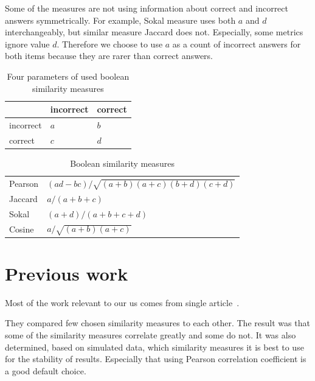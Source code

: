 \documentclass[
  print, %
  table,   %
  nolof,     %
  nolot,     %
  nocover,
  color,
  final,
]{fithesis3}
\begin{document}
Some of the measures are not using information about correct and incorrect answers symmetrically. For example, Sokal measure uses both $a$ and $d$ interchangeably, but similar measure Jaccard does not. Especially, some metrics ignore value $d$. Therefore we choose to use $a$ as a count of incorrect answers for both items because they are rarer than correct answers.


\begin{table}
  \begin{tabular}{ | l | l l | }
      \hline
      \cellcolor[gray]{1.0} & incorrect & correct \\ \hline
      incorrect & $a$ & $b$ \\
      correct & $c$ & $d$ \\ \hline
  \end{tabular}

  \caption{Four parameters of used boolean similarity measures}
  \label{tab:boolean-attributes}
\end{table}

\begin{table}
  \begin{tabular}{ | l | l | }
        \hline
      Pearson & $(ad - bc) / \sqrt{(a+b)(a+c)(b+d)(c+d)}$ \\
      Jaccard & $a / (a+b+c)$                             \\
      Sokal   & $(a+d)/(a+b+c+d)$                         \\
      Cosine  & $a / \sqrt{ (a+b)(a+c) }$                 \\
      \hline
  \end{tabular}
  \caption{Boolean similarity measures}
  \label{tab:boolean-similarity-measures}
\end{table}


\section{Previous work}\label{previous-work}

Most of the work relevant to our us comes from single article~\cite{pelanek2017measuring}.

They compared few chosen similarity measures to each other. The result was that some of the similarity measures correlate greatly and some do not. It was also determined, based on simulated data, which similarity measures it is best to use for the stability of results. Especially that using Pearson correlation coefficient is a good default choice.
\end{document}
